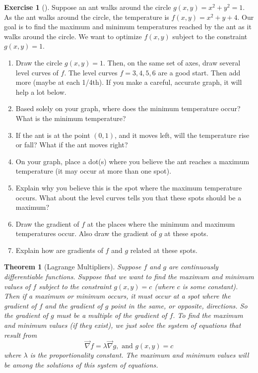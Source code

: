 \documentclass[10pt,]{book}
\theoremstyle{plain}
\newtheorem{theorem}{Theorem}[section]
\theoremstyle{definition}
\theoremstyle{definition}
\theoremstyle{definition}
\theoremstyle{definition}
\newtheorem{exploration}[project]{Exercise}
\theoremstyle{definition}
\numberwithin{equation}{section}
\begin{document}
\begin{exploration}[]\label{exploration-239}
Suppose an ant walks around the circle \(g(x,y)=x^2+y^2=1\). As the ant walks around the circle, the temperature is \(f(x,y) = x^2+y+4\). Our goal is to find the maximum and minimum temperatures reached by the ant as it walks around the circle. We want to optimize \(f(x,y)\) subject to the constraint \(g(x,y)=1\).%
\begin{enumerate}[font=\bfseries,label=(\alph*),ref=\alph*]
\item\label{task-658} Draw the circle \(g(x,y)=1\).  Then, on the same set of axes, draw several level curves of \(f\). The level curves \(f=3, 4, 5, 6\) are a good start. Then add more (maybe at each 1/4th). If you make a careful, accurate graph, it will help a lot below.%
\item\label{task-659} Based solely on your graph, where does the minimum temperature occur?  What is the minimum temperature?%
\item\label{task-660} If the ant is at the point \((0,1)\), and it moves left, will the temperature rise or fall?  What if the ant moves right?%
\item\label{task-661} On your graph, place a dot(s) where you believe the ant reaches a maximum temperature (it may occur at more than one spot).%
\item\label{task-662} Explain why you believe this is the spot where the maximum temperature occurs. What about the level curves tells you that these spots should be a maximum?%
\item\label{task-663} Draw the gradient of \(f\) at the places where the minimum and maximum temperatures occur. Also draw the gradient of \(g\) at these spots.%
\item\label{task-664} Explain how are gradients of \(f\) and \(g\) related at these spots.%
\end{enumerate}
\end{exploration}
\begin{theorem}[{Lagrange Multipliers}]\label{theorem-9}
Suppose \(f\) and \(g\) are continuously differentiable functions. Suppose that we want to find the maximum and minimum values of \(f\) subject to the constraint \(g(x,y)=c\) (where \(c\) is some constant). Then if a maximum or minimum occurs, it must occur at a spot where the gradient of \(f\) and the gradient of \(g\) point in the same, or opposite, directions. So the gradient of \(g\) must be a multiple of the gradient of \(f\). To find the maximum and minimum values (if they exist), we just solve the system of equations that result from%
\begin{equation*}
\vec \nabla f = \lambda \vec \nabla g, \text{ and }  g(x,y)=c
\end{equation*}
where \(\lambda\) is the proportionality constant. The maximum and minimum values will be among the solutions of this system of equations.%
\end{theorem}
\typeout{************************************************}
\typeout{************************************************}
\end{document}

